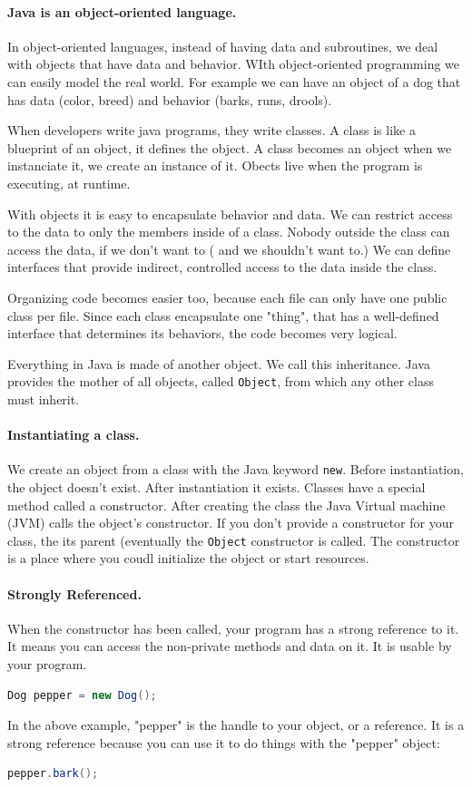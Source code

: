 \documentclass[fleqn,10pt]{SelfArx} %
\begin{document}
\paragraph{Java is an object-oriented language.} In object-oriented languages, instead of having data and subroutines, we deal with objects that have data and behavior. WIth object-oriented programming we can easily model the real world. For example we can have an object of a dog that has data (color, breed) and behavior (barks, runs, drools). 

When developers write java programs, they write classes. A class is like a blueprint of an object, it defines the object. A class becomes an object when we instanciate it, we create an instance of it. Obects live when the program is executing, at runtime.

With objects it is easy to encapsulate behavior and data. We can restrict access to the data to only the members inside of a class. Nobody outside the class can access the data, if we don't want to ( and we shouldn't want to.) We can define interfaces that provide indirect, controlled access to the data inside the class.

Organizing code becomes easier too, because each file can only have one  public class per file. Since each class encapsulate one "thing", that has a well-defined interface that determines its behaviors, the code becomes very logical.

Everything in Java is made of another object. We call this inheritance. Java provides the mother of all objects, called \texttt{Object}, from which any other class must inherit.

\paragraph{Instantiating a class.} We create an object from a class with the Java keyword \texttt{new}. Before instantiation, the object doesn't exist. After instantiation it exists. Classes have a special method called a constructor. After creating the class the Java Virtual machine (JVM) calls the object's constructor. If you don't provide a constructor for your class, the its parent (eventually the \texttt{Object} constructor is called. The constructor is a place where you coudl initialize the object or start resources.\cite{nicholas}

\paragraph{Strongly Referenced.} When the constructor has been called, your program has a strong reference to it.\cite{reference} It means you can access the non-private methods and data on it. It is usable by your program.
\begin{lstlisting}[language=Java]
Dog pepper = new Dog();
\end{lstlisting}
In the above example, "pepper" is the handle to your object, or a reference. It is a strong reference because you can use it to do things with the "pepper" object:
\begin{lstlisting}[language=Java]
pepper.bark();
\end{lstlisting}
\end{document}
